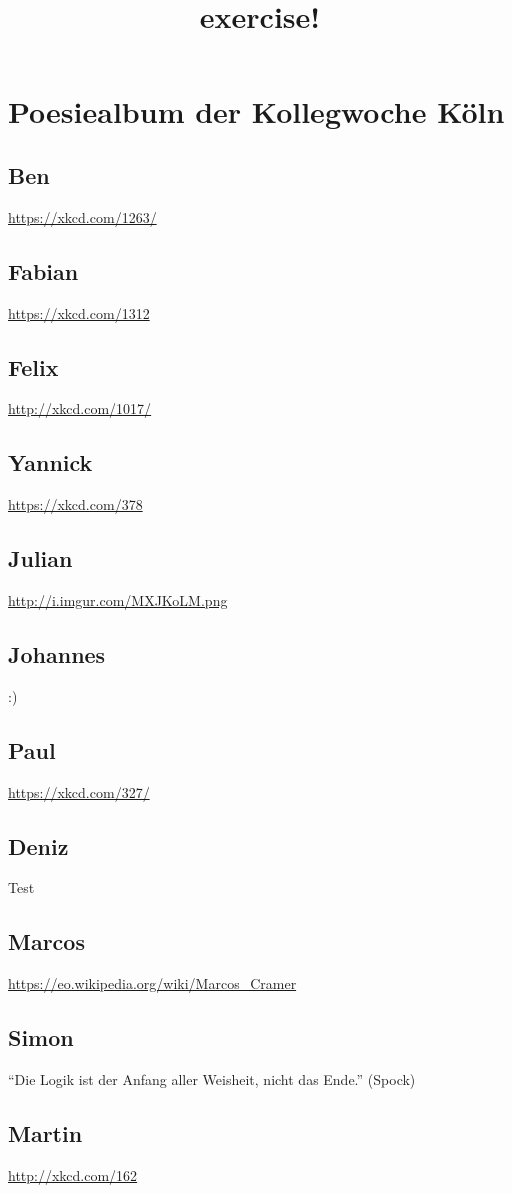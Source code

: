 \documentclass[12pt]{scrartcl}
\begin{document}
\title{exercise!}
\maketitle
\section{Poesiealbum der Kollegwoche Köln}
\subsection{Ben}
\url{https://xkcd.com/1263/}
\subsection{Fabian}
\url{https://xkcd.com/1312}
\subsection{Felix}
\url{http://xkcd.com/1017/}
\subsection{Yannick}
\url{https://xkcd.com/378}
\subsection{Julian}
\url{http://i.imgur.com/MXJKoLM.png}
\subsection{Johannes}
:)
\subsection{Paul}
\url{https://xkcd.com/327/}

\subsection{Deniz}
Test
\subsection{Marcos}
\url{https://eo.wikipedia.org/wiki/Marcos_Cramer}

\subsection{Simon}
``Die Logik ist der Anfang aller Weisheit, nicht das Ende.'' (Spock)
\subsection{Martin}
\url{http://xkcd.com/162}
\end{document}
